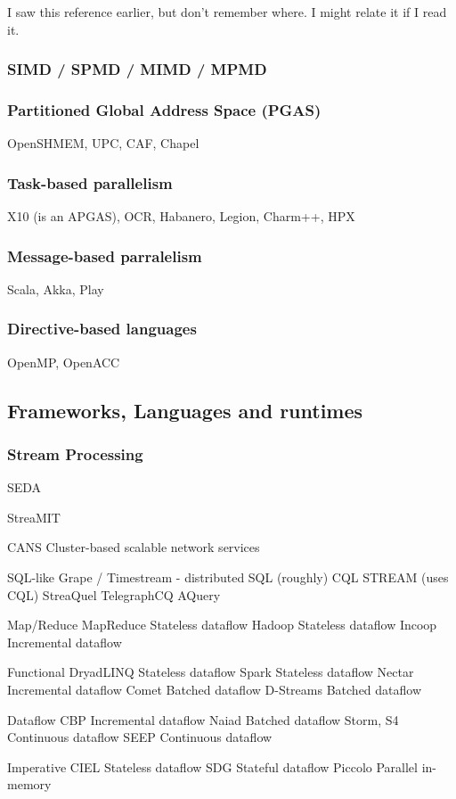 I saw this reference earlier, but don't remember where. \cite{Kahn1974}
I might relate it if I read it.

\subsubsection{SIMD / SPMD / MIMD / MPMD}

\subsubsection{Partitioned Global Address Space (PGAS)}
OpenSHMEM, UPC, CAF, Chapel


\subsubsection{Task-based parallelism}
X10 (is an APGAS), OCR, Habanero, Legion, Charm++, HPX

\subsubsection{Message-based parralelism}
Scala, Akka, Play

\subsubsection{Directive-based languages}
OpenMP, OpenACC





\subsection{Frameworks, Languages and runtimes}

\subsubsection{Stream Processing}

SEDA

StreaMIT

CANS Cluster-based scalable network services

SQL-like
  Grape / Timestream - distributed SQL (roughly)
  CQL
  STREAM (uses CQL)
  StreaQuel
  TelegraphCQ
  AQuery

Map/Reduce
  MapReduce    Stateless dataflow
  Hadoop       Stateless dataflow
  Incoop       Incremental dataflow

Functional
  DryadLINQ    Stateless dataflow
  Spark        Stateless dataflow
  Nectar       Incremental dataflow
  Comet        Batched dataflow
  D-Streams    Batched dataflow

Dataflow
  CBP          Incremental dataflow
  Naiad        Batched dataflow
  Storm, S4    Continuous dataflow
  SEEP         Continuous dataflow

Imperative
  CIEL         Stateless dataflow
  SDG          Stateful dataflow
  Piccolo      Parallel in-memory
